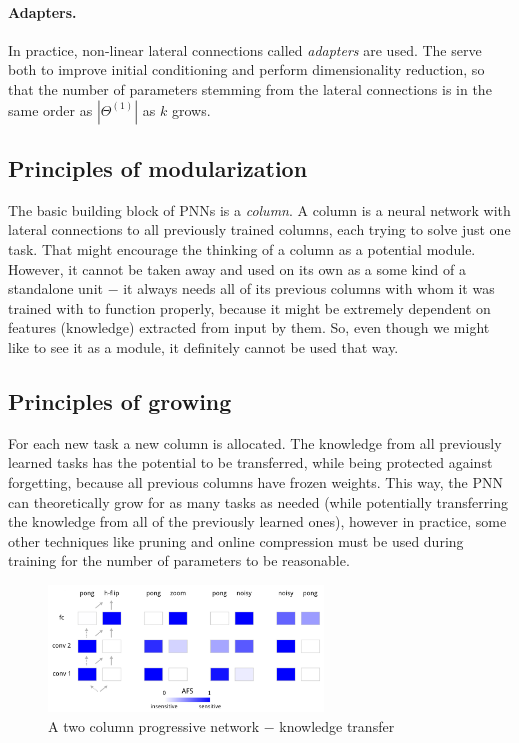 \documentclass[a4paper,twocolumn]{article}
\begin{document}
\paragraph{Adapters.} In practice, non-linear lateral connections called \textit{adapters} are used. The serve both to improve initial conditioning and perform dimensionality reduction, so that the number of parameters stemming from the lateral connections is in the same order as $\left| \Theta^{(1)} \right|$ as $k$ grows.

\subsection*{Principles of modularization}
The basic building block of PNNs is a \textit{column}. A column is a neural network with lateral connections to all previously trained columns, each trying to solve just one task. That might encourage the thinking of a column as a potential module. However, it cannot be taken away and used on its own as a some kind of a standalone unit $-$ it always needs all of its previous columns with whom it was trained with to function properly, because it might be extremely dependent on features (knowledge) extracted from input by them. So, even though we might like to see it as a module, it definitely cannot be used that way.


\subsection*{Principles of growing}
For each new task a new column is allocated. The knowledge from all previously learned tasks has the potential to be transferred, while being protected against forgetting, because all previous columns have frozen weights. This way, the PNN can theoretically grow for as many tasks as needed (while potentially transferring the knowledge from all of the previously learned ones), however in practice, some other techniques like pruning and online compression must be used during training for the number of parameters to be reasonable.


    \begin{figure}[ht]
        \centering
        \includegraphics[width=0.65\textwidth]{2-column.png}
        \caption{A two column progressive network $-$ knowledge transfer}
    \end{figure}
\end{document}
